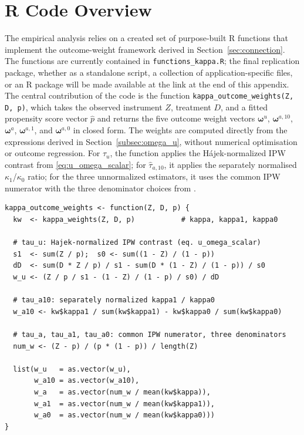 \documentclass[12pt, a4paper, oneside]{article}
\theoremstyle{plain}
\theoremstyle{definition}
\begin{document}
\newpage


\section{R Code Overview}
\label{app:code}

The empirical analysis relies on a created set of purpose-built R functions that
implement the outcome-weight framework derived in Section~\ref{sec:connection}.
The functions are currently contained in \texttt{functions\_kappa.R}; the
final replication package, whether as a standalone script, a collection of
application-specific files, or an R package will be made available at the
link at the end of this appendix.\\
The central contribution of the code is the function
\texttt{kappa\_outcome\_weights(Z, D, p)}, which takes the observed instrument
$Z$, treatment $D$, and a fitted propensity score vector $\hat{p}$ and returns
the five outcome weight vectors $\boldsymbol{\omega}^u$,
$\boldsymbol{\omega}^{a,10}$, $\boldsymbol{\omega}^a$,
$\boldsymbol{\omega}^{a,1}$, and $\boldsymbol{\omega}^{a,0}$ in closed form.
The weights are computed directly from the expressions derived in
Section~\ref{subsec:omega_u}, without numerical optimisation or outcome
regression. For $\hat\tau_u$, the function applies the Hájek-normalized
IPW contrast from \eqref{eq:u_omega_scalar}; for $\hat\tau_{a,10}$, it
applies the separately normalised $\kappa_1$/$\kappa_0$ ratio; for the
three unnormalized estimators, it uses the common IPW numerator with the
three denominator choices from \citet{sloczynski2025abadie}.

\begin{lstlisting}[caption={\texttt{kappa\_outcome\_weights()}: closed-form
  outcome weights for all five kappa estimators},
  label={lst:kappa_ow}]
kappa_outcome_weights <- function(Z, D, p) {
  kw  <- kappa_weights(Z, D, p)           # kappa, kappa1, kappa0

  # tau_u: Hajek-normalized IPW contrast (eq. u_omega_scalar)
  s1  <- sum(Z / p);  s0 <- sum((1 - Z) / (1 - p))
  dD  <- sum(D * Z / p) / s1 - sum(D * (1 - Z) / (1 - p)) / s0
  w_u <- (Z / p / s1 - (1 - Z) / (1 - p) / s0) / dD

  # tau_a10: separately normalized kappa1 / kappa0
  w_a10 <- kw$kappa1 / sum(kw$kappa1) - kw$kappa0 / sum(kw$kappa0)

  # tau_a, tau_a1, tau_a0: common IPW numerator, three denominators
  num_w <- (Z - p) / (p * (1 - p)) / length(Z)

  list(w_u   = as.vector(w_u),
       w_a10 = as.vector(w_a10),
       w_a   = as.vector(num_w / mean(kw$kappa)),
       w_a1  = as.vector(num_w / mean(kw$kappa1)),
       w_a0  = as.vector(num_w / mean(kw$kappa0)))
}
\end{lstlisting}
\end{document}
